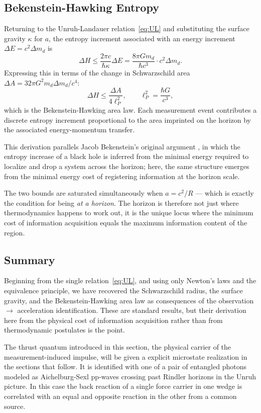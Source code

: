 \documentclass[12pt,a4paper]{article}
\begin{document}
\subsection{Bekenstein-Hawking Entropy}
Returning to the Unruh-Landauer relation~\eqref{eq:UL} and substituting the surface gravity $\kappa$ for $a$, the entropy increment associated with an energy increment $\Delta E = c^2 \Delta m_d$ is
\begin{equation}
\Delta H \leq \frac{2\pi c}{\hbar \kappa} \Delta E = \frac{8\pi G m_d}{\hbar c^3} \cdot c^2 \Delta m_d.
\end{equation}
Expressing this in terms of the change in Schwarzschild area $\Delta A = 32\pi G^2 m_d \Delta m_d / c^4$:
\begin{equation}
\Delta H \le \frac{\Delta A}{4 \ell_P^2}, \qquad \ell_P^2 = \frac{\hbar G}{c^3},
\end{equation}
which is the Bekenstein-Hawking area law. Each measurement event contributes a discrete entropy increment proportional to the area imprinted on the horizon by the associated energy-momentum transfer.

This derivation parallels Jacob Bekenstein’s original argument \cite{bekenstein}, in which the entropy increase of a black hole is inferred from the minimal energy required to localize and drop a system across the horizon; here, the same structure emerges from the minimal energy cost of registering information at the horizon scale.

The two bounds are saturated simultaneously when $a = c^2/R$ — which is exactly the condition for being {\it at a horizon}. The horizon is therefore not just where thermodynamics happens to work out, it is the unique locus where the minimum cost of information acquisition equals the maximum information content of the region.

\subsection{Summary}
Beginning from the single relation~\eqref{eq:UL}, and using only Newton's laws and the equivalence principle, we have recovered the Schwarzschild radius, the surface gravity, and the Bekenstein-Hawking area law as consequences of the observation $\rightarrow$ acceleration identification. These are standard results, but their derivation here from the physical cost of information acquisition rather than from thermodynamic postulates is the point.

The thrust quantum introduced in this section, the physical carrier of the measurement-induced impulse, will be given a explicit microstate realization in the sections that follow. It is identified with one of a pair of entangled photons modeled as Aichelburg-Sexl pp-waves crossing past Rindler horizons in the Unruh picture. In this case the back reaction of a single force carrier in one wedge is correlated with an equal and opposite reaction in the other from a common source.
\end{document}
